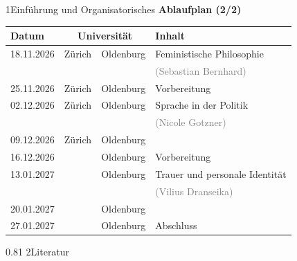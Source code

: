 \documentclass[xcolor=table,9pt,aspectratio=169]{beamer}
\begin{document}
\begin{frame}{\vspace*{10mm}1\hspace*{1em}Einführung und Organisatorisches}
\textbf{Ablaufplan (2/2)}

\smallskip
\begin{tabular}{lllp{6.6cm}}
   \arrayrulecolor{blue2}\hline
   Datum        & \multicolumn{2}{c}{Universität}   & Inhalt                                   \\
   \hline
   18.11.2026   & Zürich   & Oldenburg              & Feministische Philosophie                \\
                &          &                        & \textcolor{gray}{(Sebastian Bernhard)}   \\
   25.11.2026   & Zürich   & Oldenburg              & Vorbereitung                             \\
   02.12.2026   & Zürich   & Oldenburg              & Sprache in der Politik                   \\
                &          &                        & \textcolor{gray}{(Nicole Gotzner)}       \\
   09.12.2026   & Zürich   & Oldenburg              &                                          \\
   16.12.2026   &          & Oldenburg              & Vorbereitung                             \\
   13.01.2027   &          & Oldenburg              & Trauer und personale Identität           \\
                &          &                        & \textcolor{gray}{(Vilius Dranseika)}     \\
   20.01.2027   &          & Oldenburg              &                                          \\
   27.01.2027   &          & Oldenburg              & Abschluss                                \\
   \hline
\end{tabular}
\end{frame}


\begin{frame}
\begin{overlayarea}{\textwidth}{0.81\paperheight}{
   \vspace*{11mm}
   \textcolor{uolblue}
   {2\hspace*{1em}Literatur}
}
\end{overlayarea}
\end{frame}
\end{document}
